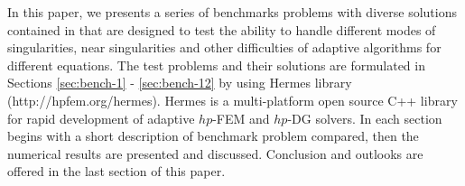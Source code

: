 In this paper, we presents a series of benchmarks problems 
with diverse solutions contained in \cite{mitchell-1}
that are designed to test the ability to handle different 
modes of singularities, near singularities and other difficulties
of adaptive algorithms for different equations.
The test problems and their solutions are formulated in Sections
\ref{sec:bench-1} - \ref{sec:bench-12} by using {\sc Hermes}
library (http://hpfem.org/hermes). {\sc Hermes} is a multi-platform 
open source C++ library for rapid development of adaptive $hp$-FEM 
and $hp$-DG solvers. In each section begins with a short description
of benchmark problem compared, then the numerical results are
presented and discussed. Conclusion and outlooks are offered
in the last section of this paper.



